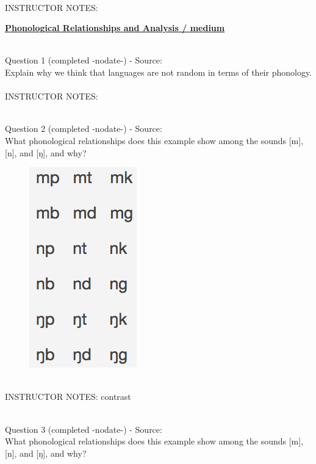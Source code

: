 \documentclass[12pt]{article}
\begin{document}
~\\
INSTRUCTOR NOTES: 


\newpage\textbf{\underline{\huge Phonological Relationships and Analysis / medium\\}}

~\\

{\large Question 1} (completed -nodate-) - Source: \\

Explain why we think that languages are not random in terms of their phonology.\\


~\\
INSTRUCTOR NOTES: 


~\\

{\large Question 2} (completed -nodate-) - Source: \\

What phonological relationships does this example show among the sounds [m], [n], and [ŋ], and why?\\

\begin{figure}[H]
\includegraphics{../images/quiz4question5_a.png}
\end{figure}

~\\
INSTRUCTOR NOTES: contrast


~\\

{\large Question 3} (completed -nodate-) - Source: \\

What phonological relationships does this example show among the sounds [m], [n], and [ŋ], and why?\\
\end{document}
